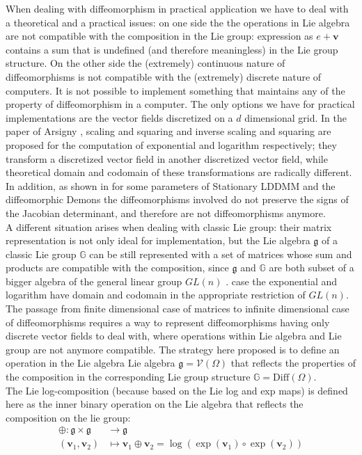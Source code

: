 When dealing with diffeomorphism in practical application we have to deal with a theoretical and a practical issues: 
on one side the
the operations in Lie algebra are not compatible with the composition in the Lie group: expression as $e + \mathbf{v}$ contains a sum that is undefined (and therefore meaningless) in the Lie group structure.
On the other side 
the (extremely) continuous nature of diffeomorphisms is not compatible with the (extremely) discrete nature of computers. It is not possible to implement something that maintains any of the property of diffeomorphism in a computer. The only options we have for practical implementations are the vector fields discretized on a $d$ dimensional grid. In the paper of Arsigny \cite{arsigny2006log}, scaling and squaring and inverse scaling and squaring are proposed for the computation of exponential and logarithm respectively; they transform a discretized vector field in another discretized vector field, while theoretical domain and codomain of these transformations are radically different. In addition, as shown in \cite{hernandez2008comparing} for some parameters of Stationary LDDMM and the diffeomorphic Demons the diffeomorphisms involved do not preserve the signs of the Jacobian determinant, and therefore are not diffeomorphisms anymore. \\
A different situation arises when dealing with classic Lie group: their matrix representation is not only ideal for implementation, but the Lie algebra $\mathfrak{g}$ of a classic Lie group $\mathbb{G}$ can be still represented with a set of matrices whose sum and products are compatible with the composition, since $\mathfrak{g}$ and $\mathbb{G}$ are both subset of a bigger algebra of the general linear group $GL(n)$ \cite{kirillov2008introduction}. case the exponential and logarithm have domain and codomain in the appropriate restriction of $GL(n)$. \\

The passage from finite dimensional case of matrices to infinite dimensional case of diffeomorphisms requires a way to represent diffeomorphisms having only discrete vector fields to deal with, where operations within Lie algebra and Lie group are not anymore compatible. The strategy here proposed is to define an operation in the Lie algebra Lie algebra $\mathfrak{g} = \mathcal{V}(\Omega)$ that reflects the properties of the composition in the corresponding Lie group structure $\mathbb{G} = \text{Diff}(\Omega)$.\\

The Lie log-composition (because based on the Lie log and exp maps) is defined here as the inner binary operation on the Lie algebra that reflects the composition on the lie group:
\begin{align}\label{eq:main_def_log_composition}
\oplus : \mathfrak{g} \times \mathfrak{g} & \longrightarrow \mathfrak{g}    \\
(\mathbf{v}_{1}, \mathbf{v}_{2}) &\longmapsto \mathbf{v}_{1}\oplus \mathbf{v}_{2} =  \log(\exp(\mathbf{v}_1)\circ \exp(\mathbf{v}_2))
\end{align}

